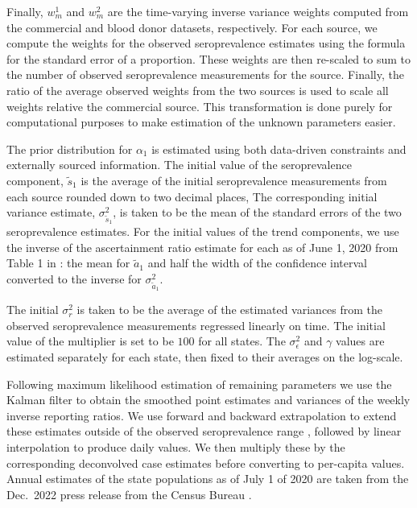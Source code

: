 Finally, $w^1_{m}$ and $w^2_{m}$ are the time-varying inverse variance weights
computed from the commercial and blood donor datasets, respectively. For each
source, we compute the weights for the observed seroprevalence estimates using
the formula for the standard error of a proportion. These weights are then
re-scaled to sum to the number of observed seroprevalence measurements for the
source. Finally, the ratio of the average observed weights from the two sources
is used to scale all weights relative the commercial source. This transformation
is done purely for computational purposes to make estimation of the unknown
parameters easier.

The prior distribution for $\alpha_1$ is estimated using both data-driven
constraints and externally sourced information. The initial value of the
seroprevalence component, $\tilde{s}_{1}$ is the average of the initial
seroprevalence measurements from each source rounded down to two decimal places,
The corresponding initial variance estimate, $\sigma^2_{\tilde{s}_{1}}$, is
taken to be the mean of the standard errors of the two seroprevalence estimates.
For the initial values of the trend components, we use the inverse of the
ascertainment ratio estimate for each as of June 1, 2020 from Table 1 in
\citep{unwin2020state}: the mean for $\tilde{a}_1$ and half the width of the
confidence interval converted to the inverse for
$\sigma^2_{\tilde{a}_1}$.

The initial $\sigma^2_r$ is taken to be the average of the estimated variances
from the observed seroprevalence measurements regressed linearly on time.
The initial value of the multiplier is set to be $100$ for all states. The
$\sigma^2_\epsilon$ and $\gamma$ values are estimated separately for each state,
then fixed to their averages on the log-scale.

Following maximum likelihood estimation of remaining parameters we use the
Kalman filter to obtain the smoothed point estimates and variances of the weekly
inverse reporting ratios. We use forward and backward extrapolation to extend
these estimates outside of the observed seroprevalence range
\citep{durbin2012time}, followed by linear interpolation to produce daily
values. We then multiply these by the
corresponding deconvolved case estimates before converting to per-capita values.
Annual estimates of the state
populations as of July 1 of 2020 are taken from the Dec.\
2022 press release from the \US Census Bureau \citep{uscensus2022annual}.





